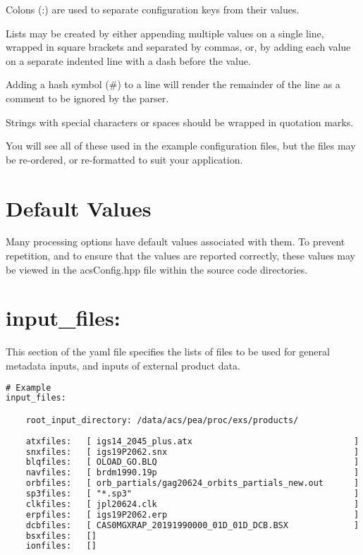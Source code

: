 Colons (:) are used to separate configuration keys from their values.

Lists may be created by either appending multiple values on a single line, wrapped in square brackets and separated by commas, or, by adding each value on a separate indented line with a dash before the value.

Adding a hash symbol (\#) to a line will render the remainder of the line as a comment to be ignored by the parser.

Strings with special characters or spaces should be wrapped in quotation marks.

You will see all of these used in the example configuration files, but the files may be re-ordered, or re-formatted to suit your application.

\section{Default Values}

Many processing options have default values associated with them. To prevent repetition, and to ensure that the values are reported correctly, these values may be viewed in the acsConfig.hpp file within the source code directories.

\section{input\_files:}

This section of the yaml file specifies the lists of files to be used for general metadata inputs, and inputs of external product data.

\begin{lstlisting}[language=xml,caption=A typical input\_files section]
# Example
input_files:

	root_input_directory: /data/acs/pea/proc/exs/products/
	
	atxfiles:   [ igs14_2045_plus.atx                                ]
	snxfiles:   [ igs19P2062.snx                                     ]
	blqfiles:   [ OLOAD_GO.BLQ                                       ]  
	navfiles:   [ brdm1990.19p                                       ]  
	orbfiles:   [ orb_partials/gag20624_orbits_partials_new.out      ]  
	sp3files:   [ "*.sp3"                                            ]
	clkfiles:   [ jpl20624.clk                                       ]  
	erpfiles:   [ igs19P2062.erp                                     ]  
	dcbfiles:   [ CAS0MGXRAP_20191990000_01D_01D_DCB.BSX             ] 
	bsxfiles:   []
	ionfiles:   [] 
\end{lstlisting}

